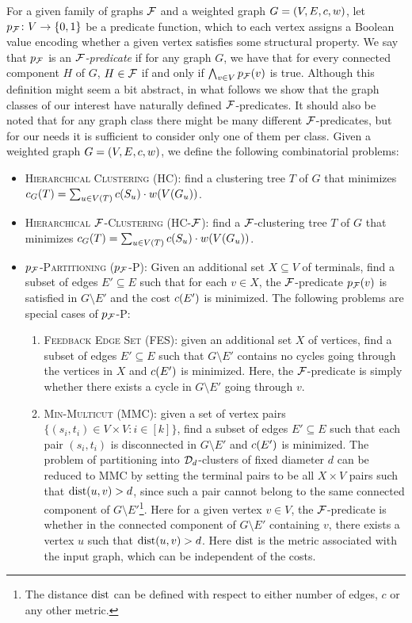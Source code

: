 For a given family of graphs $\mathcal{F}$ and a weighted graph $G=\mathopen{}\left( V,E,c,w \right)$, let $p_{\mathcal{F}}\colon V\to \mathopen{}\left\{ 0,1 \right\}$ be a predicate function, which to each vertex assigns a Boolean value encoding whether a given vertex satisfies some structural property. We say that $p_{\mathcal{F}}$ is an \emph{$\mathcal{F}$-predicate} if for any graph $G$, we have that for every connected component $H$ of $G$, $H\in \mathcal{F}$ if and only if $\bigwedge_{v \in V}p_{\mathcal{F}}\mathopen{}\left( v \right)$ is true. Although this definition might seem a bit abstract, in what follows we show that the graph classes of our interest have naturally defined $\mathcal{F}$-predicates. It should also be noted that for any graph class there might be many different $\mathcal{F}$-predicates, but for our needs it is sufficient to consider only one of them per class.
Given a weighted graph $G=\mathopen{}\left( V, E, c, w \right)$, we define the following combinatorial problems:
\begin{itemize}
    \item \textsc{Hierarchical Clustering} (\textsc{HC}): find a clustering tree $T$ of $G$ that minimizes ${c}_G\mathopen{}\left( T \right) = \sum_{u\in V\mathopen{}\left( T \right)} c(S_u) \cdot w\mathopen{}\left( V\mathopen{}\left( G_u \right) \right)$.
    \item \textsc{Hierarchical $\mathcal{F}$-Clustering} (\textsc{HC-$\mathcal{F}$}): find a $\mathcal{F}$-clustering tree $T$ of $G$ that minimizes ${c}_G\mathopen{}\left( T \right) = \sum_{u\in V\mathopen{}\left( T \right)} c(S_u) \cdot w\mathopen{}\left( V\mathopen{}\left( G_u \right) \right)$.
    \item \textsc{$p_{\mathcal{F}}$-Partitioning} (\textsc{$p_{\mathcal{F}}$-P})\label{prob:pfp}:
    Given an additional set $X\subseteq V$ of terminals, find a subset of edges $E'\subseteq E$ such that for each $v\in X$, the $\mathcal{F}$-predicate $p_{\mathcal{F}}\mathopen{}\left( v \right)$ is satisfied in $G\setminus E'$ and the cost $c\mathopen{}\left( E' \right)$ is minimized.
    The following problems are special cases of \textsc{$p_{\mathcal{F}}$-P}:
    \begin{enumerate}
    \item \textsc{Feedback Edge Set} (\textsc{FES}): given an additional set $X$ of vertices, find a subset of edges $E'\subseteq E$ such that $G\setminus E'$ contains no cycles going through the vertices in $X$ and $c\mathopen{}\left( E' \right)$ is minimized. Here, the $\mathcal{F}$-predicate is simply whether there exists a cycle in $G\setminus E'$ going through $v$.

    \item \textsc{Min-Multicut} (\textsc{MMC}): given a set of vertex pairs $\{(s_i, t_i)\in V\times V\colon i\in [k]\}$, find a subset of edges $E'\subseteq E$ such that each pair $(s_i, t_i)$ is disconnected in $G\setminus E'$ and $c\mathopen{}\left( E' \right)$ is minimized. The problem of partitioning into $\mathcal{D}_d$-clusters of fixed diameter $d$ can be reduced to \textsc{MMC} by setting the terminal pairs to be all $X \times V$ pairs such that $\text{dist}\mathopen{}\left( u, v \right) > d$, since such a pair cannot belong to the same connected component of $G\setminus E'$\footnote{The distance $\text{dist}$ can be defined with respect to either number of edges, $c$ or any other metric.}. Here for a given vertex $v\in V$, the $\mathcal{F}$-predicate is whether in the connected component of $G\setminus E'$ containing $v$, there exists a vertex $u$ such that $\text{dist}\mathopen{}\left( u, v \right) > d$.
    Here $\text{dist}$ is the metric associated with the input graph, which can be independent of the costs.


\end{enumerate}
\end{itemize}
